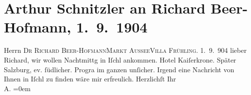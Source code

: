 

         
         \renewcommand{\erwaehntePersonen}{Personen: Richard Beer-Hofmann}
         \renewcommand{\erwaehnteOrte}{Orte: Bad Aussee, Hotel Kaiserkrone, Salzburg, Südbahnhotel, Villa Frühling, Wien, XVIII., Währing}
         \renewcommand{\erwaehnteWerke}{}
               \section[Arthur Schnitzler an Richard Beer-Hofmann, 1. 9. 1904]{ Arthur Schnitzler an Richard Beer-Hofmann, 1. 9. 1904}\nopagebreak{}\rehead{ }\begin{ledgroupsized}[t]{13cm}\normalsize\beginnumbering{} \toendnotes[C]{\smallbreak\pagebreak[2]} 
\toendnotes[C]{\smallbreak}\pstart{}{\pb}Herrn \textsc{Dr Richard
                     Beer-Hofmann}\pend{}\pstart{}\textsc{Markt Aussee}\pend{}\pstart{}\textsc{Villa Frühling}.\pend{}{\bigskip}\pstart
           \raggedleft{}{\pb}1. 9. 904\pend
           \pstart
           lieber Richard, wir wollen \label{K_L01433-1v}\label{K_L01433-1h}{ }Nachtmittg in Iſchl ankommen. Hotel Kaiſerkrone. Später Salzburg, ev. ſüdlicher. Progra{\geminationm} im
               ganzen unſicher. Irgend eine Nachricht von Ihnen in Iſchl zu finden wäre mir
               erfreulich.\pend
           \pstart
           Herzlichſt Ihr{\\[\baselineskip]}\spacefill\mbox{A.}\pend
           \leftskip=0em{}
         
         \endnumbering{}\end{ledgroupsized}  \newcommand{\dateiname}{L01433}\newcommand{\titel}{Arthur Schnitzler an Richard Beer-Hofmann, 1. 9. 1904}\newcommand{\editorInnen}{Martin Anton Müller und Gerd-Hermann Susen}
      